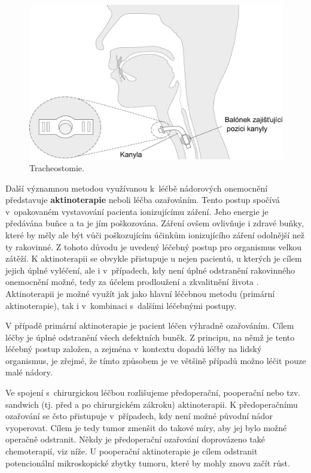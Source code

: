 \begin{figure}[htb]
  \begin{center}
    \def\svgwidth{0.9\linewidth}
    \includegraphics[width=0.9\linewidth]{ch3-cause/figures/tracheostomie}
    \caption[Tracheostomie.]{Tracheostomie.}
    \label{fig:cause:desease:tracheostomy}
  \end{center}
\end{figure}

Další významnou metodou využívanou  k~léčbě nádorových onemocnění představuje
\textbf{aktinoterapie} neboli léčba ozařováním. Tento postup spočívá v~opakovaném vystavování pacienta ionizujícímu záření. Jeho energie je předávána buňce a ta je jím poškozována. Záření ovšem ovlivňuje i
zdravé buňky, které by měly ale být vůči poškozujícím účinkům ionizujícího záření odolnější než ty rakovinné.
Z tohoto důvodu je uvedený léčebný postup pro organismus velkou zátěží.
K aktinoterapii se obvykle přistupuje u nejen pacientů, u kterých je cílem jejich úplné vyléčení, ale i v~případech, kdy není úplné odstranění rakovinného onemocnění možné, tedy za účelem prodloužení a zkvalitnění života \cite{Slavicek2000}. Aktinoterapii je možné využít jak jako hlavní léčebnou metodu (primární
aktinoterapie), tak i v~kombinaci s~dalšími léčebnými postupy.

V případě primární aktinoterapie je pacient léčen výhradně ozařováním. Cílem léčby je úplné odstranění všech defektních
buněk. Z principu, na němž je tento léčebný postup založen, a zejména v~kontextu dopadů léčby na lidský organismus, je zřejmé, že tímto způsobem je ve většině případů možno léčit pouze malé nádory.

Ve spojení s~chirurgickou léčbou rozlišujeme předoperační, pooperační nebo
tzv. sandwich (tj. před a po chirurgickém zákroku) aktinoterapii.
K předoperačnímu ozařování se čsto přistupuje v~případech, kdy není možné původní nádor vyoperovat.
Cílem je tedy tumor zmenšit do takové míry, aby jej bylo možné operačně
odstranit. Někdy je předoperační ozařování doprovázeno také chemoterapií, viz níže.
U pooperační aktinoterapie je cílem odstranit potencionální
mikroskopické zbytky tumoru, které by mohly znovu začít růst.

